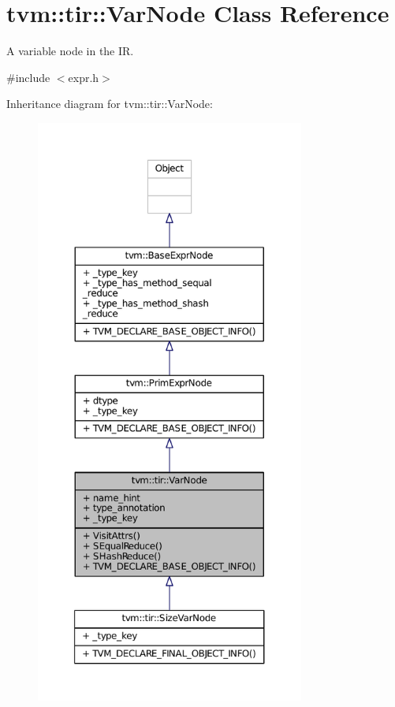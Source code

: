 \hypertarget{classtvm_1_1tir_1_1VarNode}{}\section{tvm\+:\+:tir\+:\+:Var\+Node Class Reference}
\label{classtvm_1_1tir_1_1VarNode}


A variable node in the IR.  




{\ttfamily \#include $<$expr.\+h$>$}



Inheritance diagram for tvm\+:\+:tir\+:\+:Var\+Node\+:
\nopagebreak
\begin{figure}[H]
\begin{center}
\leavevmode
\includegraphics[height=550pt]{classtvm_1_1tir_1_1VarNode__inherit__graph}
\end{center}
\end{figure}


